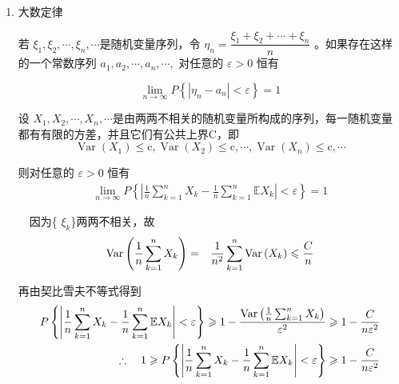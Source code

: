 \begin{enumerate}[1]
	   \item 大数定律 
	   \setlength{\parindent}{2\ccwd}
	   
	   	\begin{mydef}
			若 $  \xi_{1}, \xi_{2}, \cdots, \xi_{n}, \cdots $是随机变量序列，令 $  \eta_{n}=\dfrac{\xi_{1}+\xi_{2}+\cdots+\xi_{n}}{n}   $ 。如果存在这样的一个常数序列
			$ a_{1}, a_{2}, \cdots, a_{n}, \cdots, $ 对任意的  $ \varepsilon>0  $ 恒有
		\end{mydef}
			$$ \lim _{n \rightarrow \infty} P\left\{\left|\eta_{n}-a_{n}\right|<\varepsilon\right\}=1 $$
	   	  
		\begin{mydef}[契比雪夫大数定律]  设 $ X_{1}, X_{2}, \cdots, X_{n}, \cdots $是由两两不相关的随机变量所构成的序列，每一随机变量都有有限的方差，并且它们有公共上界C，即
	   	  $$ \operatorname{Var}\left(X_{1}\right) \leqslant \mathrm{c}, \operatorname{Var}\left(X_{2}\right) \leqslant \mathrm{c}, \cdots, \operatorname{Var}\left(X_{n}\right) \leqslant \mathrm{c}, \cdots $$
		\end{mydef}

	   	  则对任意的 $ \varepsilon>0  $ 恒有
	   	  \begin{eqnarray}
			 \lim _{n \rightarrow \infty} P\left\{\left|\frac{1}{n} \sum_{k  =  1}^{n} X_{k}-\frac{1}{n} \sum_{k =  1}^{n} 
			 \mathbb{E} X_{k}\right|<\varepsilon\right\}  =  1
			 \label{eq 2.3.4}
	   	  \end{eqnarray}
	   	  
	   	\begin{myproof}
			\ \ 因为\{ $ \xi_{k} $\}两两不相关，故
	   	   \begin{eqnarray}
	   	  \operatorname{Var}\left(\frac{1}{n} \sum_{k  =  1}^{n} X_{k}\right) & = & \frac{1}{n^{2}} \sum_{k  =  1}^{n} \operatorname{Var}\left(X_{k}\right) \leqslant \frac{C}{n} \notag
	   	  \end{eqnarray} 
	   	  
	   	  再由契比雪夫不等式得到
	   	  \begin{eqnarray}
			 P\left\{\left|\frac{1}{n} \sum_{k  =  1}^{n} X_{k}-\frac{1}{n} \sum_{k  =  1}^{n} \mathbb{E} X_{k}\right|<\varepsilon\right\} \geqslant 
			 1-\dfrac{\operatorname{Var}\left(\frac{1}{n} \sum_{k  =  1}^{n} X_{k}\right)}{\varepsilon^{2}} \geqslant 1-\dfrac{C}{n \varepsilon^{2}} \notag \\ 
	   	  \therefore \quad  1 \geqslant P\left\{\left|\dfrac{1}{n} \sum_{k  =  1}^{n} X_{k}-\frac{1}{n} \sum_{k  =  1}^{n} \mathbb{E} X_{k}\right|<\varepsilon\right\} \geqslant 1-\dfrac{C}{n \varepsilon^{2}}  \notag
	   	  \end{eqnarray}
	   	  

\end{myproof}
\end{enumerate}
